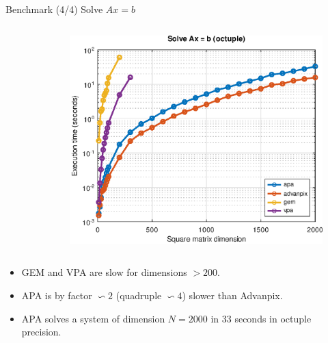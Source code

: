 \begin{frame}{Benchmark (4/4) Solve $Ax = b$}
\begin{columns}
\begin{column}{0.3\textwidth}
\begin{figure}
\end{figure}
\end{column}
\begin{column}{0.3\textwidth}
\begin{figure}
\centering
\includegraphics[width=1.0\linewidth]{res/data/2021-11-24_run-01-lin-octuple-semilogy}
\end{figure}
\end{column}
\end{columns}

\bigskip

\begin{itemize}
\item
GEM and VPA are slow for dimensions $> 200$.

\item
APA is by factor $\backsim 2$ (quadruple $\backsim 4$) slower than Advanpix.

\item
APA solves a system of dimension $N = 2000$ in 33 seconds in octuple precision.
\end{itemize}

\end{frame}